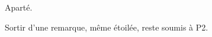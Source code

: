 \begin{remark*}
  Aparté.
\end{remark*} %
\vspace*{0.5em}
\begin{exercise}
  Sortir d'une remarque, même étoilée, reste soumis à P2.
\end{exercise}
